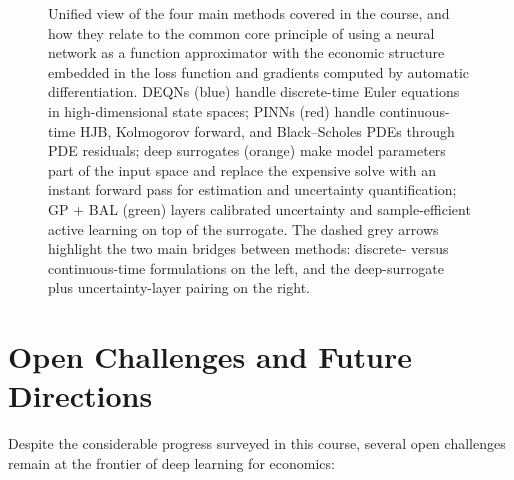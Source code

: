\documentclass[11pt,a4paper]{report}
\begin{document}
\begin{figure}[ht]
\caption{Unified view of the four main methods covered in the course, and how they relate to the common core principle of using a neural network as a function approximator with the economic structure embedded in the loss function and gradients computed by automatic differentiation. DEQNs (blue) handle discrete-time Euler equations in high-dimensional state spaces; PINNs (red) handle continuous-time HJB, Kolmogorov forward, and Black--Scholes PDEs through PDE residuals; deep surrogates (orange) make model parameters part of the input space and replace the expensive solve with an instant forward pass for estimation and uncertainty quantification; GP + BAL (green) layers calibrated uncertainty and sample-efficient active learning on top of the surrogate. The dashed grey arrows highlight the two main bridges between methods: discrete- versus continuous-time formulations on the left, and the deep-surrogate plus uncertainty-layer pairing on the right.}
\label{fig:unified_view_methods}
\end{figure}

\section{Open Challenges and Future Directions}
\label{sec:open_challenges}

Despite the considerable progress surveyed in this course, several open challenges remain at the frontier of deep learning for economics:
\end{document}
